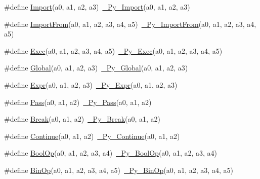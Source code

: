 \begin{DoxyCompactItemize}
\item 
\#define \mbox{\hyperlink{_python-ast_8h_abbf91a20d51b8107b75aede82d50726b}{Import}}(a0,  a1,  a2,  a3)~\mbox{\hyperlink{_python-ast_8h_a023382d2810dee50a2b0f8185043b76d}{\+\_\+\+Py\+\_\+\+Import}}(a0, a1, a2, a3)
\item 
\#define \mbox{\hyperlink{_python-ast_8h_a3314d17e8fe4cdbe5895a90e7caecfc5}{Import\+From}}(a0,  a1,  a2,  a3,  a4,  a5)~\mbox{\hyperlink{_python-ast_8h_a78ee6afb979ce2e9d7c57aface1dc7f4}{\+\_\+\+Py\+\_\+\+Import\+From}}(a0, a1, a2, a3, a4, a5)
\item 
\#define \mbox{\hyperlink{_python-ast_8h_a306e50f881257e70fcc045f9021b23be}{Exec}}(a0,  a1,  a2,  a3,  a4,  a5)~\mbox{\hyperlink{_python-ast_8h_a99ce3e6b27859f459d9b50528048e693}{\+\_\+\+Py\+\_\+\+Exec}}(a0, a1, a2, a3, a4, a5)
\item 
\#define \mbox{\hyperlink{_python-ast_8h_a84df3f9175f02c4e11e66859646892f7}{Global}}(a0,  a1,  a2,  a3)~\mbox{\hyperlink{_python-ast_8h_a7070f4e0f5c60bfcaaa0ca6b0c42c840}{\+\_\+\+Py\+\_\+\+Global}}(a0, a1, a2, a3)
\item 
\#define \mbox{\hyperlink{_python-ast_8h_a5f27997222de791e41ad21dd595b9a33}{Expr}}(a0,  a1,  a2,  a3)~\mbox{\hyperlink{_python-ast_8h_a2c246c3845b9932449f5a9afdabc2683}{\+\_\+\+Py\+\_\+\+Expr}}(a0, a1, a2, a3)
\item 
\#define \mbox{\hyperlink{_python-ast_8h_aee98f791da192bec0e50ed774c9f141f}{Pass}}(a0,  a1,  a2)~\mbox{\hyperlink{_python-ast_8h_afa9885f0b471f7e1a640ac82c9be090f}{\+\_\+\+Py\+\_\+\+Pass}}(a0, a1, a2)
\item 
\#define \mbox{\hyperlink{_python-ast_8h_a6d6a655cbc825addae6355c2ece3395b}{Break}}(a0,  a1,  a2)~\mbox{\hyperlink{_python-ast_8h_a9bddbd991d9285df556fcda52f160aec}{\+\_\+\+Py\+\_\+\+Break}}(a0, a1, a2)
\item 
\#define \mbox{\hyperlink{_python-ast_8h_a1c690eb0347cce446137935dc279a7f3}{Continue}}(a0,  a1,  a2)~\mbox{\hyperlink{_python-ast_8h_a135a80565203c375f54525ca9b46bbc8}{\+\_\+\+Py\+\_\+\+Continue}}(a0, a1, a2)
\item 
\#define \mbox{\hyperlink{_python-ast_8h_a4bab162f247adb9c24bea326f7dce65c}{Bool\+Op}}(a0,  a1,  a2,  a3,  a4)~\mbox{\hyperlink{_python-ast_8h_a8441169f71a59d05748d4652ad0f691f}{\+\_\+\+Py\+\_\+\+Bool\+Op}}(a0, a1, a2, a3, a4)
\item 
\#define \mbox{\hyperlink{_python-ast_8h_a5288875143f3b5555cb1c1d5eb371e0d}{Bin\+Op}}(a0,  a1,  a2,  a3,  a4,  a5)~\mbox{\hyperlink{_python-ast_8h_ab7097e515f5a83d39487d5a585463dac}{\+\_\+\+Py\+\_\+\+Bin\+Op}}(a0, a1, a2, a3, a4, a5)

\end{DoxyCompactItemize}
